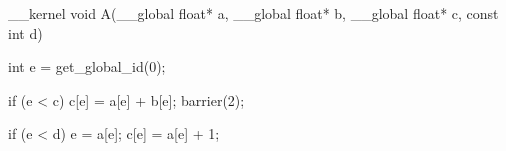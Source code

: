 __kernel void A(__global float* a, __global float* b, __global float* c, const int d) {
  int e = get_global_id(0);

  if (e < c) {
    c[e] = a[e] + b[e];
  }
  barrier(2);

  if (e < d) {
    e = a[e];
    c[e] = a[e] + 1;
  }
}
